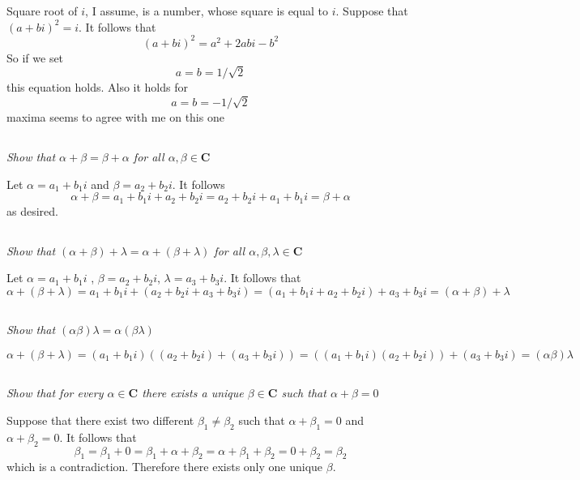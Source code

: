 \documentclass[10pt,oneside,titlepage]{book}
\begin{document}
Square root of $i$, I assume, is a number, whose square is equal to $i$.
Suppose that $(a + bi)^2 = i$. It follows that
$$(a + bi)^2 = a^2 + 2abi - b^2$$
So if we set $$a = b = 1/\sqrt{2}$$ this equation holds. Also it holds for
$$a = b = -1/\sqrt{2}$$
maxima seems to agree with me on this one

\subsection{}
\textit{Show that $\alpha + \beta = \beta + \alpha$ for all
  $\alpha, \beta \in \textbf{C}$}

Let $\alpha = a_1 + b_1 i$ and $\beta = a_2 + b_2 i$. It follows
$$\alpha + \beta = a_1 + b_1 i + a_2 + b_2 i = a_2 + b_2 i + a_1 + b_1 i =
\beta  + \alpha$$
as desired.

\subsection{}
\textit{Show that $(\alpha + \beta) + \lambda = \alpha + (\beta + \lambda)$
  for all  $\alpha, \beta, \lambda \in \textbf{C}$}

Let $\alpha = a_1 + b_1 i$ , $\beta = a_2 + b_2 i$, $\lambda = a_3 + b_3 i$.
It follows that 
$$\alpha + (\beta + \lambda)  = a_1 + b_1 i + (a_2 + b_2 i + a_3 + b_3 i) =
(a_1 + b_1 i + a_2 + b_2 i) + a_3 + b_3 i = 
(\alpha + \beta) + \lambda$$

\subsection{}
\textit{Show that $(\alpha \beta) \lambda = \alpha( \beta \lambda)$}

$$\alpha + (\beta + \lambda)  = (a_1 + b_1 i) ((a_2 + b_2 i) + (a_3 + b_3 i)) =
((a_1 + b_1 i)(a_2 + b_2 i)) + (a_3 + b_3 i) = 
(\alpha \beta) \lambda$$

\subsection{}
\textit{Show that for every $\alpha \in \textbf{C}$ there exists a unique
  $\beta \in \textbf{C}$ such that $\alpha + \beta = 0$}

Suppose that there exist two different $\beta_1 \neq \beta_2$ such that
$\alpha + \beta_1 = 0$ and $\alpha + \beta_2 = 0$. It follows that
$$ \beta_1 = \beta_1 + 0 =  \beta_1 + \alpha + \beta_2 = \alpha + \beta_1  + \beta_2 = 0  + \beta_2 = \beta_2$$
which is a contradiction. Therefore there exists only one unique $\beta$.
\end{document}
